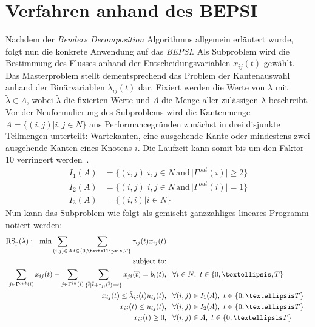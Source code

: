 \documentclass[a4paper, 11pt]{scrreprt}
\begin{document}
\section{Verfahren anhand des BEPSI}
Nachdem der \textit{Benders Decomposition} Algorithmus allgemein erläutert wurde, folgt
nun die konkrete Anwendung auf das \textit{BEPSI}.
Als Subproblem wird die Bestimmung des Flusses anhand der Entscheidungsvariablen $x_{ij}(t)$ gewählt.
Das Masterproblem stellt dementsprechend das Problem der Kantenauswahl anhand der Binärvariablen
$\lambda_{ij}(t)$ dar. Fixiert werden die Werte von $\lambda$ mit $\tilde{\lambda} \in \Lambda$,
wobei $\tilde{\lambda}$ die fixierten Werte und $\Lambda$ die Menge aller zulässigen $\lambda$
beschreibt.\\
Vor der Neuformulierung des Subproblems wird die Kantenmenge $A = \{(i, j) | i, j \in N\}$ aus
Performancegründen zunächst in drei disjunkte Teilmengen unterteilt:
Wartekanten, eine ausgehende Kante oder mindestens zwei ausgehende Kanten eines Knotens $i$.
Die Laufzeit kann somit bis um den Faktor 10 verringert werden~\cite{bepsi}.
\begin{align*}
  I_1(A) &= \{(i,j)|i,j \in N \,\text{and}\, |\Gamma^{out}(i)|\geq 2\}\\
  I_2(A) &= \{(i,j)|i,j \in N \,\text{and}\, |\Gamma^{out}(i)| = 1\}\\
  I_3(A) &= \{(i,i)|i \in N \}
\end{align*}
Nun kann das Subproblem wie folgt als gemischt-ganzzahliges lineares Programm notiert werden:
\begin{align}
  \text{RS}_{\text{p}}(\tilde{\lambda}):\,\,\,\,  \text{min} \sum_{(i,j)\in A} \sum_{t \in \{0,…,T\}} \tau_{ij}(t)x_{ij}(t)\label{eq:min}\\
  \text{subject to:}\notag\\
  \sum_{j \in \Gamma^{out} (i)}x_{ij}(t) - \sum_{j \in \Gamma^{in} (i)}\sum_{\{\overline{t}|\overline{t}+\tau_{ji}(\overline{t}) = t\}}x_{ji}(\overline{t}) = b_i(t),&\,\,\,\,\, \forall i \in N,\,\, t \in \{0,…,T\}\label{eq:flusserhaltung2}\\
  x_{ij}(t) \leq \tilde{\lambda}_{ij}(t) u_{ij}(t),&\,\,\,\,\, \forall (i,j) \in I_{1}(A),\,\, t \in \{0,…T\}\label{eq:kapazitaet1}\\
  x_{ij}(t) \leq u_{ij}(t),&\,\,\,\,\, \forall (i,j) \in I_{2}(A),\,\, t \in \{0,…T\}\label{eq:kapazitaet2}\\
  x_{ij}(t) \geq 0,&\,\,\,\,\, \forall (i,j) \in A,\,\, t \in \{0,…T\}\label{eq:nicht_negativ}
\end{align}
\end{document}
